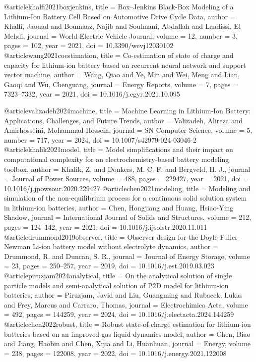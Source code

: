 @article{khalfi2021boxjenkins,
	title   = {Box--Jenkins Black-Box Modeling of a Lithium-Ion Battery Cell Based on Automotive Drive Cycle Data},
	author  = {Khalfi, Jaouad and Boumaaz, Najib and Soulmani, Abdallah and Laadissi, El Mehdi},
	journal = {World Electric Vehicle Journal},
	volume  = {12},
	number  = {3},
	pages   = {102},
	year    = {2021},
	doi     = {10.3390/wevj12030102}
}
@article{wang2021coestimation,
	title   = {Co-estimation of state of charge and capacity for lithium-ion battery based on recurrent neural network and support vector machine},
	author  = {Wang, Qiao and Ye, Min and Wei, Meng and Lian, Gaoqi and Wu, Chenguang},
	journal = {Energy Reports},
	volume  = {7},
	pages   = {7323--7332},
	year    = {2021},
	doi     = {10.1016/j.egyr.2021.10.095}
}

@article{valizadeh2024machine,
	title   = {Machine Learning in Lithium-Ion Battery: Applications, Challenges, and Future Trends},
	author  = {Valizadeh, Alireza and Amirhosseini, Mohammad Hossein},
	journal = {SN Computer Science},
	volume  = {5},
	number  = {717},
	year    = {2024},
	doi     = {10.1007/s42979-024-03046-2}
}
@article{khalik2021model,
	title   = {Model simplifications and their impact on computational complexity for an electrochemistry-based battery modeling toolbox},
	author  = {Khalik, Z. and Donkers, M. C. F. and Bergveld, H. J.},
	journal = {Journal of Power Sources},
	volume  = {488},
	pages   = {229427},
	year    = {2021},
	doi     = {10.1016/j.jpowsour.2020.229427}
}
@article{chen2021modeling,
	title   = {Modeling and simulation of the non-equilibrium process for a continuous solid solution system in lithium-ion batteries},
	author  = {Chen, Hongjiang and Huang, Hsiao-Ying Shadow},
	journal = {International Journal of Solids and Structures},
	volume  = {212},
	pages   = {124--142},
	year    = {2021},
	doi     = {10.1016/j.ijsolstr.2020.11.011}
}
@article{drummond2019observer,
	title   = {Observer design for the Doyle-Fuller-Newman Li-ion battery model without electrolyte dynamics},
	author  = {Drummond, R. and Duncan, S. R.},
	journal = {Journal of Energy Storage},
	volume  = {23},
	pages   = {250--257},
	year    = {2019},
	doi     = {10.1016/j.est.2019.03.023}
}
@article{piruzjam2024analytical,
	title   = {On the analytical solution of single particle models and semi-analytical solution of P2D model for lithium-ion batteries},
	author  = {Piruzjam, Javid and Liu, Guangming and Rubacek, Lukas and Frey, Marcus and Carraro, Thomas},
	journal = {Electrochimica Acta},
	volume  = {492},
	pages   = {144259},
	year    = {2024},
	doi     = {10.1016/j.electacta.2024.144259}
}
@article{chen2022robust,
	title   = {Robust state-of-charge estimation for lithium-ion batteries based on an improved gas-liquid dynamics model},
	author  = {Chen, Biao and Jiang, Haobin and Chen, Xijia and Li, Huanhuan},
	journal = {Energy},
	volume  = {238},
	pages   = {122008},
	year    = {2022},
	doi     = {10.1016/j.energy.2021.122008}
}


